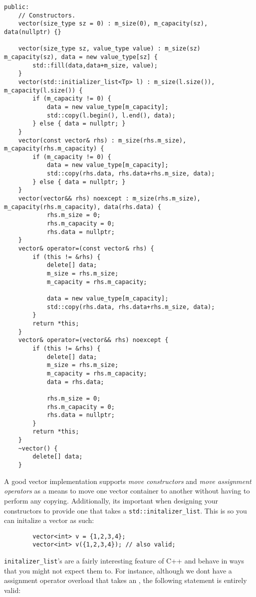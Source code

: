 \documentclass{report}
\begin{document}
    \begin{verbatim}
public:
    // Constructors.
    vector(size_type sz = 0) : m_size(0), m_capacity(sz), data(nullptr) {}

    vector(size_type sz, value_type value) : m_size(sz) m_capacity(sz), data = new value_type[sz] {
        std::fill(data,data+m_size, value);
    }
    vector(std::initializer_list<Tp> l) : m_size(l.size()), m_capacity(l.size()) {
        if (m_capacity != 0) {
            data = new value_type[m_capacity];
            std::copy(l.begin(), l.end(), data);
        } else { data = nullptr; }
    }
    vector(const vector& rhs) : m_size(rhs.m_size), m_capacity(rhs.m_capacity) {
        if (m_capacity != 0) {
            data = new value_type[m_capacity];
            std::copy(rhs.data, rhs.data+rhs.m_size, data);
        } else { data = nullptr; }
    }
    vector(vector&& rhs) noexcept : m_size(rhs.m_size), m_capacity(rhs.m_capacity), data(rhs.data) {
            rhs.m_size = 0;
            rhs.m_capacity = 0;
            rhs.data = nullptr;
    }
    vector& operator=(const vector& rhs) { 
        if (this != &rhs) {
            delete[] data; 
            m_size = rhs.m_size;
            m_capacity = rhs.m_capacity;
            
            data = new value_type[m_capacity];
            std::copy(rhs.data, rhs.data+rhs.m_size, data);
        } 
        return *this;
    }
    vector& operator=(vector&& rhs) noexcept { 
        if (this != &rhs) {
            delete[] data;
            m_size = rhs.m_size;
            m_capacity = rhs.m_capacity;
            data = rhs.data;

            rhs.m_size = 0;
            rhs.m_capacity = 0;
            rhs.data = nullptr;
        }
        return *this;
    }
    ~vector() {
        delete[] data;
    }
     \end{verbatim}
     A good vector implementation supports \textit{move constructors} and \textit{move assignment operators} as a means to move one vector container to another without having to perform any copying. Additionally, its important when designing your constructors to provide one that takes a \texttt{std::initalizer\_list}. This is so you can initalize a vector as such:
     \begin{verbatim}
        vector<int> v = {1,2,3,4};
        vector<int> v({1,2,3,4}); // also valid;
     \end{verbatim}
     \bigbreak \noindent
     \texttt{initalizer\_list}'s are a fairly interesting feature of C++ and behave in ways that you might not expect them to. For instance, although we dont have a assignment operator overload that takes an , the following statement is entirely valid:
\end{document}
